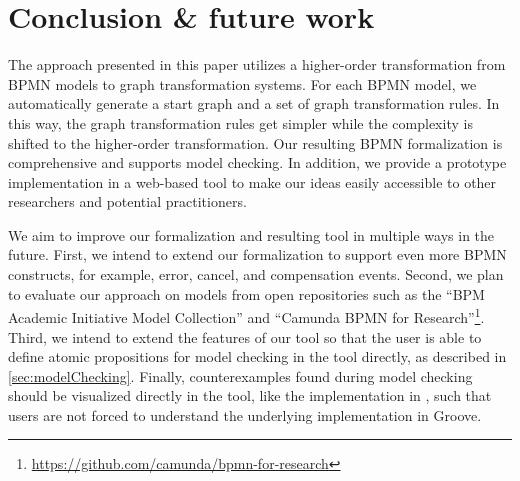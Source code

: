 \documentclass[submission, copyright, creativecommons]{eptcs}
\begin{document}
\section{Conclusion \& future work} \label{sec:conclusion}
The approach presented in this paper utilizes a higher-order transformation from BPMN models to graph transformation systems. 
For each BPMN model, we automatically generate a start graph and a set of graph transformation rules.
In this way, the graph transformation rules get simpler while the complexity is shifted to the higher-order transformation.
Our resulting BPMN formalization is comprehensive and supports model checking.
In addition, we provide a prototype implementation in a web-based tool to make our ideas easily accessible to other researchers and potential practitioners.

We aim to improve our formalization and resulting tool in multiple ways in the future.
First, we intend to extend our formalization to support even more BPMN constructs, for example, error, cancel, and compensation events.
Second, we plan to evaluate our approach on models from open repositories such as the \enquote{BPM Academic Initiative Model Collection} \cite{weskeModelCollectionBusiness2020} and  \enquote{Camunda BPMN for
Research}\footnote{\url{https://github.com/camunda/bpmn-for-research}}.
Third, we intend to extend the features of our tool so that the user is able to define atomic propositions for model checking in the tool directly, as described in \cref{sec:modelChecking}.
Finally, counterexamples found during model checking should be visualized directly in the tool, like the implementation in \cite{houhouFirstOrderLogicVerification2022}, such that users are not forced to understand the underlying implementation in Groove.


\end{document}
